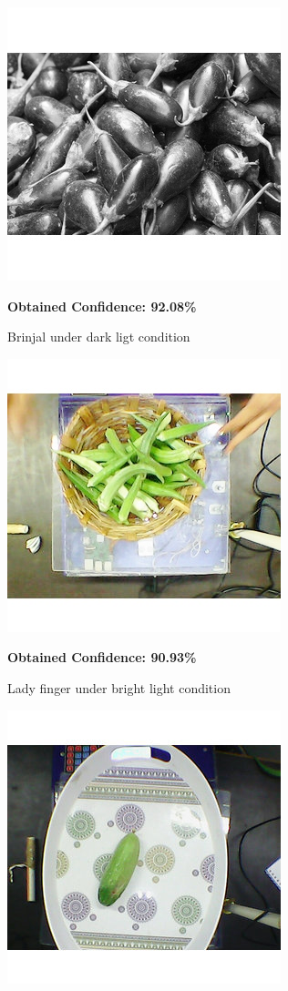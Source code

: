 \documentclass[a4paper,12pt,oneside]{book}
\begin{document}
\begin{itemize}
	  \begin{figure}[!ht]
	  	\centering
	  	\includegraphics[width=0.5\linewidth]{brinjal-dark}
	  	\caption{Brinjal under dark ligt condition} \textbf{Obtained Confidence: 92.08\%}
	  	\label{fig:brinjal-dark}
	  \end{figure}
	 \hfill
	  \begin{figure}[!ht]
	  	\centering
	  	\includegraphics[width=0.5\linewidth]{"lady_finger - light"}
	  	\caption{Lady finger under bright light condition}\textbf{ Obtained Confidence: 90.93\%}
	  	\label{fig:ladyfinger---light}
	  \end{figure}
  \hfill
	  \begin{figure}[!ht]
	  	\centering
	  	\includegraphics[width=0.5\linewidth]{cucumber-tray}

\end{figure}
\end{itemize}
\end{document}

